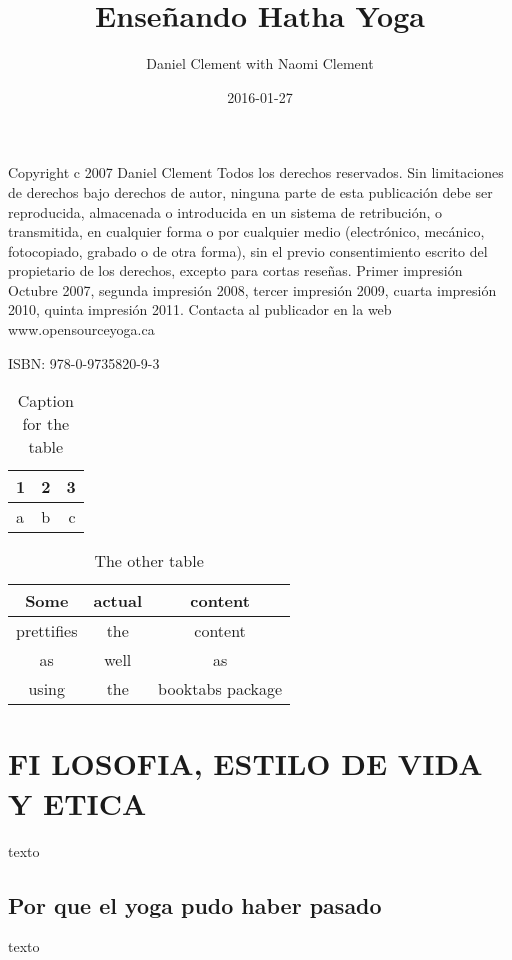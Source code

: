\documentclass[a4paper]{article}
\title{Enseñando Hatha Yoga}
\date{2016-01-27}
\author{Daniel Clement with Naomi Clement}
\begin{document}
\maketitle

\newpage
Copyright c 2007 Daniel Clement
Todos los derechos reservados. Sin limitaciones de derechos bajo 
derechos de autor, ninguna parte de esta publicación debe ser 
reproducida, almacenada o introducida en un sistema de 
retribución, o transmitida, en cualquier forma o por cualquier 
medio (electrónico, mecánico, fotocopiado, grabado o de otra 
forma), sin el previo consentimiento escrito del propietario de 
los derechos, excepto para cortas reseñas.
Primer impresión Octubre 2007, segunda impresión 2008, tercer 
impresión 2009, cuarta impresión 2010, quinta impresión 2011.
Contacta al publicador en la web www.opensourceyoga.ca

ISBN: 978-0-9735820-9-3

\newpage
\tableofcontents
\newpage


\begin{table}[h!]
	\centering
	\begin{tabular}{l|c||r}
		1 & 2 & 3\\
		\hline
		a & b & c\\
	\end{tabular}
	\caption{Caption for the table}
	\label{tab:table}
\end{table}


\begin{table}[h!]
	\centering
	\begin{tabular}{ccc}
		\toprule
		Some & actual & content\\
		\midrule
		prettifies & the & content\\
		as & well & as \\
		using & the & booktabs package\\
		\bottomrule
	\end{tabular}
	\caption{The other table}
	\label{tab:table2}
\end{table}

\section{FI LOSOFIA, ESTILO DE VIDA Y ETICA}
texto

\subsection{Por que el yoga pudo haber pasado}
texto
\end{document}
